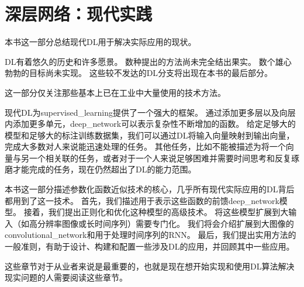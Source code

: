 \part{深层网络：现代实践}
\label{part:deep_networks_modern_practices}

\newpage
本书这一部分总结现代\gls{DL}用于解决实际应用的现状。

\gls{DL}有着悠久的历史和许多愿景。
数种提出的方法尚未完全结出果实。
数个雄心勃勃的目标尚未实现。
这些较不发达的\gls{DL}分支将出现在本书的最后部分。

这一部分仅关注那些基本上已在工业中大量使用的技术方法。

现代\gls{DL}为\gls{supervised_learning}提供了一个强大的框架。
通过添加更多层以及向层内添加更多单元，\gls{deep_network}可以表示复杂性不断增加的函数。
给定足够大的模型和足够大的标注训练数据集，我们可以通过\gls{DL}将输入向量映射到输出向量，完成大多数对人来说能迅速处理的任务。
其他任务，比如不能被描述为将一个向量与另一个相关联的任务，或者对于一个人来说足够困难并需要时间思考和反复琢磨才能完成的任务，现在仍然超出了\gls{DL}的能力范围。

本书这一部分描述参数化函数近似技术的核心，几乎所有现代实际应用的\gls{DL}背后都用到了这一技术。
首先，我们描述用于表示这些函数的前馈\gls{deep_network}模型。
接着，我们提出正则化和优化这种模型的高级技术。
将这些模型扩展到大输入（如高分辨率图像或长时间序列）需要专门化。
我们将会介绍扩展到大图像的\gls{convolutional_network}和用于处理时间序列的\gls{RNN}。
最后，我们提出实用方法的一般准则，有助于设计、构建和配置一些涉及\gls{DL}的应用，并回顾其中一些应用。

这些章节对于从业者来说是最重要的，也就是现在想开始实现和使用\gls{DL}算法解决现实问题的人需要阅读这些章节。


%
%
% 


%
%


